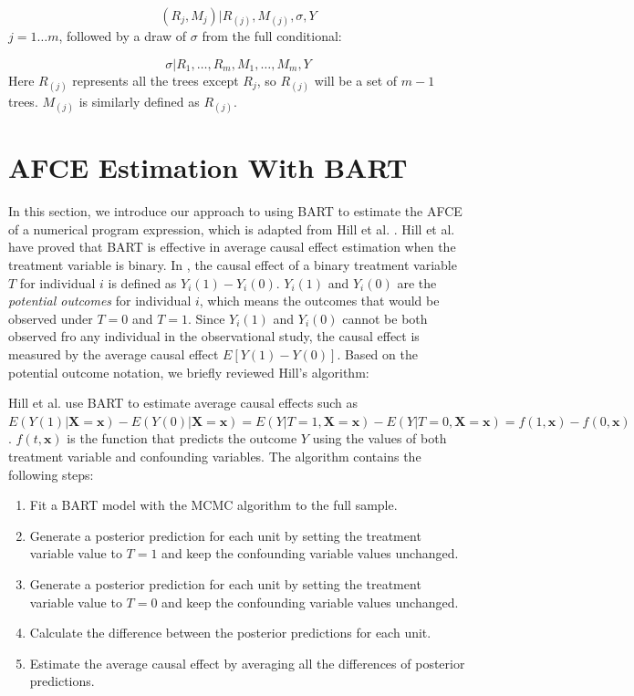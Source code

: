 \begin{equation*}
(R_j,M_j)|R_{(j)}, M_{(j)}, \sigma, Y
\end{equation*}
$j=1 \ldots m$, followed by a draw of $\sigma$ from the full conditional:

\begin{equation*}
\sigma |{R_1}, \ldots ,{R_m},{M_1}, \ldots ,{M_m},Y
\end{equation*}
Here $R_{(j)}$ represents all the trees except $R_j$, so $R_{(j)}$ will be a set of $m-1$ trees. $M_{(j)}$ is similarly defined as $R_{(j)}$.

\section{AFCE Estimation With BART}\label{BARTafce}%

In this section, we introduce our approach to using BART to estimate the AFCE of a numerical program expression, which is adapted from Hill et al. \cite{hill2012bayesian}. Hill et al. have proved that BART is effective in average causal effect estimation when the treatment variable is binary. In \cite{hill2012bayesian}, the causal effect of a binary treatment variable $T$ for individual $i$ is defined as $Y_i(1)-Y_i(0)$. $Y_i(1)$ and $Y_i(0)$ are the {\it potential outcomes} for individual $i$, which means the outcomes that would be observed under $T=0$ and $T=1$. Since $Y_i(1)$ and $Y_i(0)$ cannot be both observed fro any individual in the observational study, the causal effect is measured by the average causal effect $E[Y(1)-Y(0)]$.  Based on the potential outcome notation, we briefly reviewed Hill’s algorithm:

Hill et al. use BART to estimate average causal effects such as $E(Y(1)|\pmb{X}=\pmb{x}) - E(Y(0)|\pmb{X}=\pmb{x})=E(Y|T=1, \pmb{X}=\pmb{x})-E(Y|T=0, \pmb{X}=\pmb{x})=f(1,\pmb{x})-f(0,\pmb{x})$ . $f(t,\pmb{x})$ is the function that predicts the outcome $Y$ using the values of both treatment variable and confounding variables.  The algorithm contains the following steps:
\begin{enumerate}
\item Fit a BART model with the MCMC algorithm to the full sample.
\item Generate a posterior prediction for each unit by setting the treatment variable value to $T=1$ and keep the confounding variable values unchanged.
\item Generate a posterior prediction for each unit by setting the treatment variable value to $T=0$ and keep the confounding variable values unchanged.
\item Calculate the difference between the posterior predictions for each unit.
\item Estimate the average causal effect by averaging all the differences of posterior predictions.
\end{enumerate}

